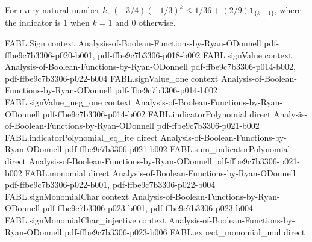 \begin{theorem}
\label{FABL.neg_three_fourths_mul_neg_one_third_pow_le}
\leanok
{}
For every natural number $k$, $(-3/4)(-1/3)^k\le 1/36+(2/9)\mathbf{1}_{\{k=1\}}$, where
the indicator is $1$ when $k=1$ and $0$ otherwise.
\end{theorem}

\begin{theorem}
\label{FABL.condorcetWinnerProbability_le}
\leanok
{}
\proofstep
  {FABL.Sign}
  {context}
  {Analysis-of-Boolean-Functions-by-Ryan-ODonnell}
  {pdf-ffbe9c7b3306-p020-b001,
    pdf-ffbe9c7b3306-p018-b002}
\proofstep
  {FABL.signValue}
  {context}
  {Analysis-of-Boolean-Functions-by-Ryan-ODonnell}
  {pdf-ffbe9c7b3306-p014-b002,
    pdf-ffbe9c7b3306-p022-b004}
\proofstep
  {FABL.signValue_one}
  {context}
  {Analysis-of-Boolean-Functions-by-Ryan-ODonnell}
  {pdf-ffbe9c7b3306-p014-b002}
\proofstep
  {FABL.signValue_neg_one}
  {context}
  {Analysis-of-Boolean-Functions-by-Ryan-ODonnell}
  {pdf-ffbe9c7b3306-p014-b002}
\proofstep
  {FABL.indicatorPolynomial}
  {direct}
  {Analysis-of-Boolean-Functions-by-Ryan-ODonnell}
  {pdf-ffbe9c7b3306-p021-b002}
\proofstep
  {FABL.indicatorPolynomial_eq_ite}
  {direct}
  {Analysis-of-Boolean-Functions-by-Ryan-ODonnell}
  {pdf-ffbe9c7b3306-p021-b002}
\proofstep
  {FABL.sum_indicatorPolynomial}
  {direct}
  {Analysis-of-Boolean-Functions-by-Ryan-ODonnell}
  {pdf-ffbe9c7b3306-p021-b002}
\proofstep
  {FABL.monomial}
  {direct}
  {Analysis-of-Boolean-Functions-by-Ryan-ODonnell}
  {pdf-ffbe9c7b3306-p022-b001,
    pdf-ffbe9c7b3306-p022-b004}
\proofstep
  {FABL.signMonomialChar}
  {context}
  {Analysis-of-Boolean-Functions-by-Ryan-ODonnell}
  {pdf-ffbe9c7b3306-p023-b001,
    pdf-ffbe9c7b3306-p023-b004}
\proofstep
  {FABL.signMonomialChar_injective}
  {context}
  {Analysis-of-Boolean-Functions-by-Ryan-ODonnell}
  {pdf-ffbe9c7b3306-p023-b006}
\proofstep
  {FABL.expect_monomial_mul}
  {direct}

\end{theorem}
